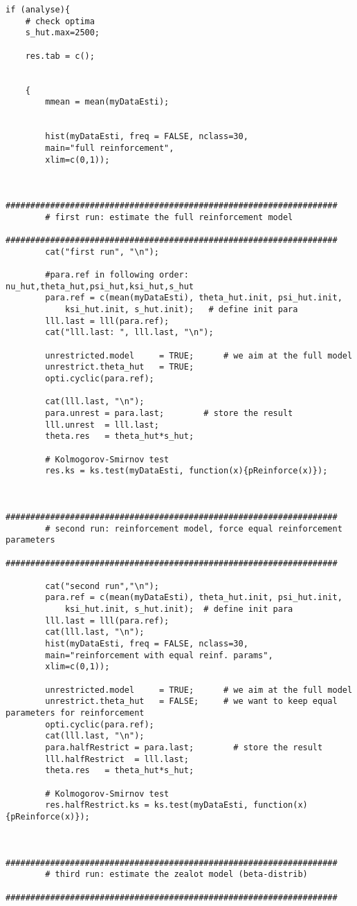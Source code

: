 \begin{lstlisting}
if (analyse){
	# check optima
	s_hut.max=2500;
	
	res.tab = c();
	
	
	{
		mmean = mean(myDataEsti);
		
		
		hist(myDataEsti, freq = FALSE, nclass=30, 
		main="full reinforcement",
		xlim=c(0,1));
		
		
		###################################################################
		# first run: estimate the full reinforcement model
		###################################################################
		cat("first run", "\n");
		
		#para.ref in following order: nu_hut,theta_hut,psi_hut,ksi_hut,s_hut
		para.ref = c(mean(myDataEsti), theta_hut.init, psi_hut.init,
			ksi_hut.init, s_hut.init);   # define init para
		lll.last = lll(para.ref);
		cat("lll.last: ", lll.last, "\n");
		
		unrestricted.model     = TRUE;      # we aim at the full model
		unrestrict.theta_hut   = TRUE;
		opti.cyclic(para.ref);
		
		cat(lll.last, "\n");
		para.unrest = para.last;        # store the result
		lll.unrest  = lll.last;
		theta.res   = theta_hut*s_hut;
		
		# Kolmogorov-Smirnov test
		res.ks = ks.test(myDataEsti, function(x){pReinforce(x)}); 
		
		
		###################################################################
		# second run: reinforcement model, force equal reinforcement parameters 
		###################################################################
		
		cat("second run","\n");
		para.ref = c(mean(myDataEsti), theta_hut.init, psi_hut.init,
			ksi_hut.init, s_hut.init);  # define init para
		lll.last = lll(para.ref);
		cat(lll.last, "\n");
		hist(myDataEsti, freq = FALSE, nclass=30, 
		main="reinforcement with equal reinf. params",
		xlim=c(0,1));
		
		unrestricted.model     = TRUE;      # we aim at the full model
		unrestrict.theta_hut   = FALSE;     # we want to keep equal parameters for reinforcement
		opti.cyclic(para.ref);
		cat(lll.last, "\n");
		para.halfRestrict = para.last;        # store the result
		lll.halfRestrict  = lll.last;
		theta.res   = theta_hut*s_hut;
		
		# Kolmogorov-Smirnov test
		res.halfRestrict.ks = ks.test(myDataEsti, function(x){pReinforce(x)}); 
		
		
		###################################################################
		# third run: estimate the zealot model (beta-distrib)
		###################################################################
		

\end{lstlisting}
